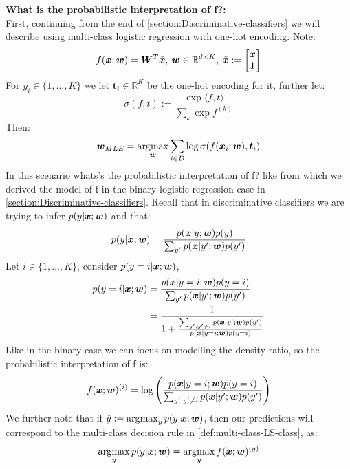 \begin{appendices}
\begin{question} \label{question:prob-interp-f}
    \textbf{What is the probabilistic interpretation of f?:} \\
    First, continuing from the end of \cref{section:Discriminative-classifiers} we will describe using multi-class logistic regression with one-hot encoding. Note:
    \begin{align}
        f(\bm{x};\bm{w}) = \bm{W}^{T} \tilde{\bm{x}}, \: \bm{w} \in \mathbb{R}^{d \times K}, \: \tilde{\bm{x}} := 
        \begin{bmatrix}
            \bm{x} \\
            \bm{1}
        \end{bmatrix}
    \end{align}
    For $y_{i} \in \{1,...,K\}$ we let $\bm{t}_{i} \in \mathbb{R}^{K}$ be the one-hot encoding for it, further let:
    \begin{equation}
        \sigma(f,t) := \frac{\exp \langle f,t \rangle}{\sum_{k} \exp f^{(k)}}
    \end{equation}
    Then:
    \begin{equation}
        \bm{w}_{MLE} = \operatorname*{arg\!\max}_{\bm{w}} \sum_{i \in D} \log \sigma(f(\bm{x}_{i} ; \bm{w}), \bm{t}_{i})
    \end{equation}
    In this scenario whats's the probabilistic interpretation of f? like from which we derived the model of f in the binary logistic regression case in \cref{section:Discriminative-classifiers}. Recall that in discriminative classifiers we are trying to infer $p(y|\bm{x};\bm{w})$ and that:
    \begin{equation}
        p(y|\bm{x};\bm{w}) = \frac{p(\bm{x}|y;\bm{w})p(y)}{\sum_{y'} p(\bm{x}|y';\bm{w})p(y')}
    \end{equation}
    Let $i \in \{1,...,K\}$, consider $p(y=i|\bm{x};\bm{w})$,
    \begin{align}
        p(y=i |\bm{x};\bm{w}) &{} = \frac{p(\bm{x}|y=i;\bm{w})p(y=i)}{\sum_{y'} p(\bm{x}|y';\bm{w})p(y')} \\
        &= \frac{1}{1+ \frac{\sum_{y',y' \neq i} p(\bm{x}|y';\bm{w})p(y')}{p(\bm{x}|y=i;\bm{w})p(y=i)}}
    \end{align}
    Like in the binary case we can focus on modelling the density ratio, so the probabilistic interpretation of f is:
    \begin{equation}
        f(\bm{x};\bm{w})^{(i)} = \log \left(\frac{p(\bm{x}|y=i;\bm{w})p(y=i)}{\sum_{y',y'\neq i} p(\bm{x}|y';\bm{w}) p(y')} \right)
    \end{equation}
    We further note that if $\hat{y} := \operatorname*{arg\!\max}_{y} p(y|\bm{x};\bm{w})$, then our predictions will correspond to the multi-class decision rule in \cref{def:multi-class-LS-class}, as:
    \begin{equation}
        \operatorname*{arg\!\max}_{y} p(y|\bm{x};\bm{w}) = \operatorname*{arg\!\max}_{y} f(\bm{x};\bm{w})^{(y)}
    \end{equation}
\end{question}


\end{appendices}